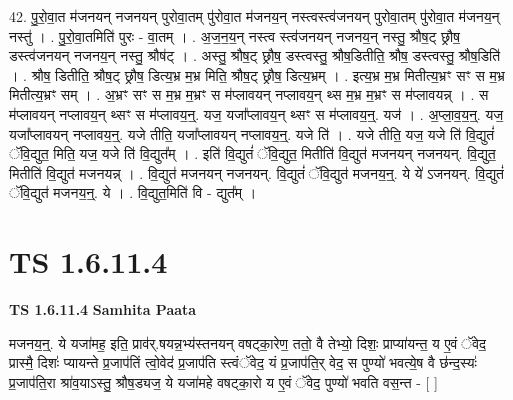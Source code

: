 \documentclass[17pt]{extarticle}
\begin{document}
42. पु॒रो॒वा॒त म॑जनयन् नजनयन् पुरोवा॒तम् पु॑रोवा॒त म॑जनय॒न् नस्त्वस्त्व॑जनयन् पुरोवा॒तम् पु॑रोवा॒त म॑जनय॒न् नस्तु॑ । . पु॒रो॒वा॒तमिति॑ पुरः - वा॒तम् । . अ॒ज॒न॒य॒न् नस्त्व स्त्व॑जनयन् नजनय॒न् नस्तु॒ श्रौष॒ट् छ्रौष॒ डस्त्व॑जनयन् नजनय॒न् नस्तु॒ श्रौष॑ट् । . अस्तु॒ श्रौष॒ट् छ्रौष॒ डस्त्वस्तु॒ श्रौष॒डितीति॒ श्रौष॒ डस्त्वस्तु॒ श्रौष॒डिति॑ । . श्रौष॒ डितीति॒ श्रौष॒ट् छ्रौष॒ डित्य॒भ्र म॒भ्र मिति॒ श्रौष॒ट् छ्रौष॒ डित्य॒भ्रम् । . इत्य॒भ्र म॒भ्र मितीत्य॒भ्रꣳ सꣳ स म॒भ्र मितीत्य॒भ्रꣳ सम् । . अ॒भ्रꣳ सꣳ स म॒भ्र म॒भ्रꣳ स म॑प्लावयन् नप्लावय॒न् थ्स म॒भ्र म॒भ्रꣳ स म॑प्लावयन्न् । . स म॑प्लावयन् नप्लावय॒न् थ्सꣳ स म॑प्लावय॒न्॒. यज॒ यजा᳚प्लावय॒न् थ्सꣳ स म॑प्लावय॒न्॒. यज॑ । . अ॒प्ला॒व॒य॒न्॒. यज॒ यजा᳚प्लावयन् नप्लावय॒न्॒. यजे तीति॒ यजा᳚प्लावयन् नप्लावय॒न्॒. यजे ति॑ । . यजे तीति॒ यज॒ यजे ति॑ वि॒द्युतं॑ ॅवि॒द्युत॒ मिति॒ यज॒ यजे ति॑ वि॒द्युत᳚म् । . इति॑ वि॒द्युतं॑ ॅवि॒द्युत॒ मितीति॑ वि॒द्युत॑ मजनयन् नजनयन्. वि॒द्युत॒ मितीति॑ वि॒द्युत॑ मजनयन्न् । . वि॒द्युत॑ मजनयन् नजनयन्. वि॒द्युतं॑ ॅवि॒द्युत॑ मजनय॒न्॒. ये ये॑ ऽजनयन्. वि॒द्युतं॑ ॅवि॒द्युत॑ मजनय॒न्॒. ये । . वि॒द्युत॒मिति॑ वि - द्युत᳚म् । \newline
\pagebreak
{}

\section{ TS 1.6.11.4 }

\textbf{TS 1.6.11.4 } \newline
\textbf{Samhita Paata} \newline

मजनय॒न्॒. ये यजा॑मह॒ इति॒ प्राव॑र्.षयन्न॒भ्य॑स्तनयन् वषट्का॒रेण॒ ततो॒ वै तेभ्यो॒ दिशः॒ प्राप्या॑यन्त॒ य ए॒वं ॅवेद॒ प्रास्मै॒ दिशः॑ प्यायन्ते प्र॒जाप॑तिं त्वो॒वेद॑ प्र॒जाप॑ति स्त्वंॅवेद॒ यं प्र॒जाप॑ति॒र् वेद॒ स पुण्यो॑ भवत्ये॒ष वै छ॑न्द॒स्यः॑ प्र॒जाप॑ति॒रा श्रा॑व॒याऽस्तु॒ श्रौष॒ड्यज॒ ये यजा॑महे वषट्का॒रो य ए॒वं ॅवेद॒ पुण्यो॑ भवति वस॒न्त - [ ] \newline
\end{document}
